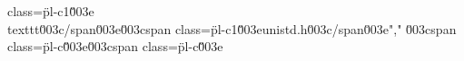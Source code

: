 class=\"pl-c1\"\u003e\\texttt\u003c/span\u003e{\u003cspan class=\"pl-c1\"\u003eunistd.h\u003c/span\u003e}","        \u003cspan class=\"pl-c\"\u003e\u003cspan class=\"pl-c\"\u003e%